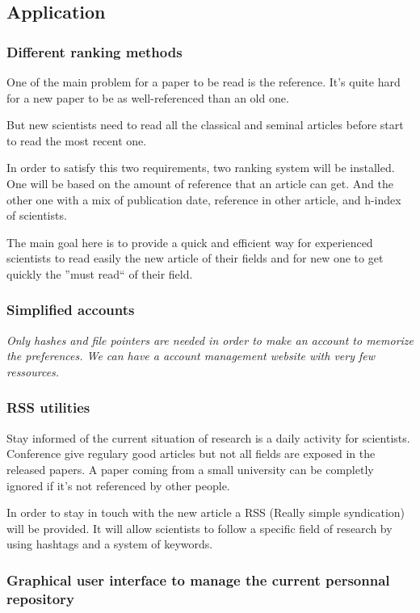 \subsection{Application}

\subsubsection{Different ranking methods}

One of the main problem for a paper to be read is the reference. It's
quite hard for a new paper to be as well-referenced than an old one.

But new scientists need to read all the classical and seminal 
articles before start to read the most recent one.

In order to satisfy this two requirements, two ranking system will
be installed. One will be based on the amount of reference that an
article can get. And the other one with a mix of publication date,
reference in other article, and h-index of scientists.

The main goal here is to provide a quick and efficient way for
experienced scientists to read easily the new article of their fields
and for new one to get quickly the ''must read`` of their field.

\subsubsection{Simplified accounts}

\textit{Only hashes and file pointers are needed in order to make an
account to memorize the preferences. We can have a account management
website with very few ressources.}

\subsubsection{RSS utilities}

Stay informed of the current situation of research is a daily
activity for scientists. Conference give regulary good articles but
not all fields are exposed in the released papers. A paper coming from
a small university can be completly ignored if it's not referenced by
other people.

In order to stay in touch with the new article a RSS 
(Really simple syndication) will be provided. It will allow scientists
to follow a specific field of research by using hashtags and a system
of keywords.

\subsubsection{Graphical user interface to manage the current personnal repository}

